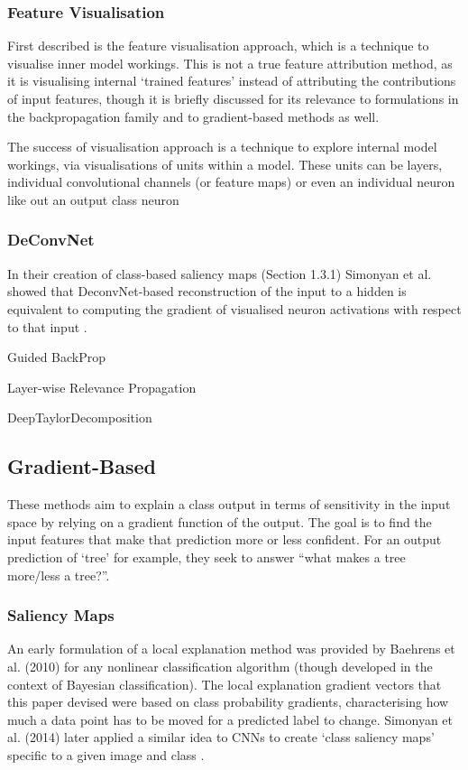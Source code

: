 \documentclass[main]{subfiles}
\begin{document}
\subsubsection{Feature Visualisation}
First described is the feature visualisation approach, which is a technique to visualise inner model workings. This is not a true feature attribution method, as it is visualising internal `trained features' instead of attributing the contributions of input features, though it is briefly discussed for its relevance to formulations in the backpropagation family and to gradient-based methods as well.

The success of  visualisation approach is a technique to explore internal model workings, via visualisations of units within a model. These units can be layers, individual convolutional channels (or feature maps) or even an individual neuron like out an output class neuron


\subsubsection{DeConvNet}


In their creation of class-based saliency maps (Section 1.3.1) Simonyan et al. showed that DeconvNet-based reconstruction of the input to a hidden is equivalent to computing the gradient of visualised neuron activations with respect to that input \cite{saliencyII}.

Guided BackProp

Layer-wise Relevance Propagation 

DeepTaylorDecomposition





\subsection{Gradient-Based}
These methods aim to explain a class output in terms of sensitivity in the input space by relying on a gradient function of the output. The goal is to find the input features that make that prediction more or less confident.  For an output prediction of `tree' for example, they seek to answer ``what makes a tree more/less a tree?''.

\subsubsection{Saliency Maps}
An early formulation of a local explanation method was provided by Baehrens et al. (2010) for any nonlinear classification algorithm \cite{saliencyI} (though developed in the context of Bayesian classification). The local explanation gradient vectors that this paper devised were based on class probability gradients, characterising how much a data point has to be moved for a predicted label to change. Simonyan et al. (2014) later applied a similar idea to CNNs to create `class saliency maps' specific to a given image and class \cite{saliencyII}. 
\end{document}
